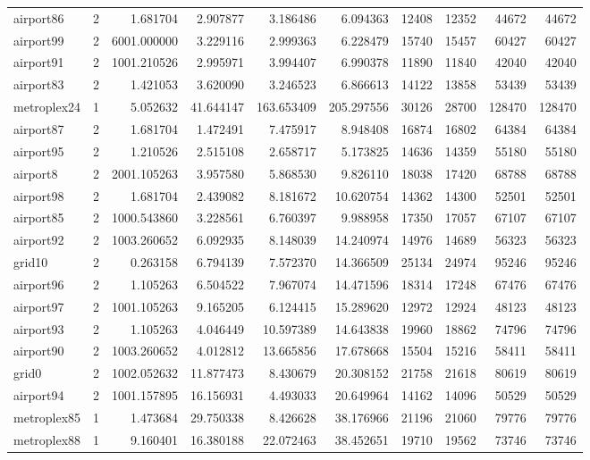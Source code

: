 \begin{longtable}{|l|r|r|r|r|r|r|r|r|r|}
airport86 & 2 & 1.681704 & 2.907877 & 3.186486 & 6.094363 & 12408 & 12352 & 44672 & 44672 \\
airport99 & 2 & 6001.000000 & 3.229116 & 2.999363 & 6.228479 & 15740 & 15457 & 60427 & 60427 \\
airport91 & 2 & 1001.210526 & 2.995971 & 3.994407 & 6.990378 & 11890 & 11840 & 42040 & 42040 \\
airport83 & 2 & 1.421053 & 3.620090 & 3.246523 & 6.866613 & 14122 & 13858 & 53439 & 53439 \\
metroplex24 & 1 & 5.052632 & 41.644147 & 163.653409 & 205.297556 & 30126 & 28700 & 128470 & 128470 \\
airport87 & 2 & 1.681704 & 1.472491 & 7.475917 & 8.948408 & 16874 & 16802 & 64384 & 64384 \\
airport95 & 2 & 1.210526 & 2.515108 & 2.658717 & 5.173825 & 14636 & 14359 & 55180 & 55180 \\
airport8 & 2 & 2001.105263 & 3.957580 & 5.868530 & 9.826110 & 18038 & 17420 & 68788 & 68788 \\
airport98 & 2 & 1.681704 & 2.439082 & 8.181672 & 10.620754 & 14362 & 14300 & 52501 & 52501 \\
airport85 & 2 & 1000.543860 & 3.228561 & 6.760397 & 9.988958 & 17350 & 17057 & 67107 & 67107 \\
airport92 & 2 & 1003.260652 & 6.092935 & 8.148039 & 14.240974 & 14976 & 14689 & 56323 & 56323 \\
grid10 & 2 & 0.263158 & 6.794139 & 7.572370 & 14.366509 & 25134 & 24974 & 95246 & 95246 \\
airport96 & 2 & 1.105263 & 6.504522 & 7.967074 & 14.471596 & 18314 & 17248 & 67476 & 67476 \\
airport97 & 2 & 1001.105263 & 9.165205 & 6.124415 & 15.289620 & 12972 & 12924 & 48123 & 48123 \\
airport93 & 2 & 1.105263 & 4.046449 & 10.597389 & 14.643838 & 19960 & 18862 & 74796 & 74796 \\
airport90 & 2 & 1003.260652 & 4.012812 & 13.665856 & 17.678668 & 15504 & 15216 & 58411 & 58411 \\
grid0 & 2 & 1002.052632 & 11.877473 & 8.430679 & 20.308152 & 21758 & 21618 & 80619 & 80619 \\
airport94 & 2 & 1001.157895 & 16.156931 & 4.493033 & 20.649964 & 14162 & 14096 & 50529 & 50529 \\
metroplex85 & 1 & 1.473684 & 29.750338 & 8.426628 & 38.176966 & 21196 & 21060 & 79776 & 79776 \\
metroplex88 & 1 & 9.160401 & 16.380188 & 22.072463 & 38.452651 & 19710 & 19562 & 73746 & 73746 \\

\end{longtable}
